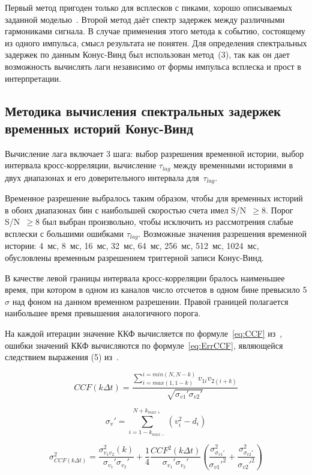 Первый метод пригоден только для всплесков с пиками, хорошо описываемых заданной моделью~\citep[формула (1) в][]{Norris_2005}. Второй метод даёт спектр задержек между различными гармониками сигнала. В случае применения этого метода к событию, состоящему из одного импульса, смысл результата не понятен. Для определения спектральных задержек по данным Конус-Винд был использован метод~(3), так как он дает возможность вычислять лаги независимо от формы импульса всплеска и прост в интерпретации.

\subsection{Методика вычисления спектральных задержек временных историй Конус-Винд}
Вычисление лага включает 3 шага: выбор разрешения временной истории, выбор интервала кросс-корреляции, вычисление $\tau_{lag}$ между временными историями в двух диапазонах и его доверительного интервала для~$\tau_{lag}$. 

Временное разрешение выбралось таким образом, чтобы для временных историй в обоих диапазонах бин с наибольшей скоростью счета имел S/N~$\geq 8$. Порог S/N~$\geq 8$ был выбран произвольно, чтобы исключить из рассмотрения слабые всплески с большими ошибками $\tau_{lag}$. Возможные значения разрешения временной истории: 4~мс, 8~мс, 16~мс, 32~мс, 64~мс, 256~мс, 512~мс, 1024~мс, обусловлены временным разрешением триггерной записи Конус-Винд.

В качестве левой границы интервала кросс-корреляции бралось наименьшее время, при котором в одном из каналов число отсчетов в одном бине превысило 5$\sigma$ над фоном на данном временном разрешении. Правой границей полагается наибольшее время превышения аналогичного порога. 

На каждой итерации значение ККФ вычисляется по формуле~\ref{eq:CCF} из~\citep{Band_1997}, ошибки значений ККФ вычисляются по формуле~\ref{eq:ErrCCF}, являющейся следствием выражения (5) из~\citep{Fenimore_1995}.

\begin{equation}\label{eq:CCF}
CCF(k\Delta t) = \frac{\sum^{i=min(N, N-k)}_{i=max(1, 1-k)}v_{1i}v_{2(i+k)}}{\sqrt{\sigma_{v1}'\sigma_{v2}'}}
\end{equation}

\begin{equation}
\sigma_{v}' = \sum_{i=1-k_{max-}}^{N+k_{max+}}(v_i^2 -d_i)
\end{equation}

\begin{equation}\label{eq:ErrCCF}
\sigma_{CCF(k\Delta t)}^2 = \frac{\sigma_{v_1 v_2}^2(k)}{\sigma_{v_1}'\sigma_{v_2}'}+ \frac{1}{4}\frac{CCF^2(k\Delta t)}{\sigma_{v_1}'\sigma_{v_2}'}\left( \frac{\sigma_{\sigma_{v1}'}^2}{\sigma_{v1}'^2} +\frac{\sigma_{\sigma_{v2}'}^2}{\sigma_{v2}'^2} \right)
\end{equation}

